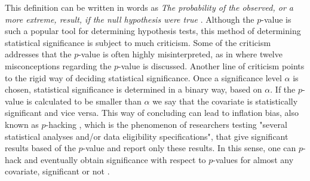 This definition can be written in words as \textit{The probability of the observed, or a more extreme, result, if the null hypothesis were true} \citep{Goodman2008}.
\newline
\newline
Although the $p$-value is such a popular tool for determining hypothesis tests, this method of determining statistical significance is subject to much criticism. 
Some of the criticism addresses that the $p$-value is often highly misinterpreted, as in \citet{Goodman2008} where twelve misconceptions regarding the $p$-value is discussed.
Another line of criticism points to the rigid way of deciding statistical significance. 
Once a significance level $\alpha$ is chosen, statistical significance is determined in a binary way, based on $\alpha$.
If the $p$-value is calculated to be smaller than $\alpha$ we say that the covariate is statistically significant and vice versa. 
This way of concluding can lead to inflation bias, also known as $p$-hacking \citep{HeadHolman_2015}, which is the phenomenon of researchers testing "several statistical analyses and/or data eligibility specifications"\citep{HeadHolman_2015}, that give significant results based of the $p$-value and report only these results.
In this sense, one can $p$-hack and eventually obtain significance with respect to $p$-values for almost any covariate, significant or not \citep{Simmons_significance}.
